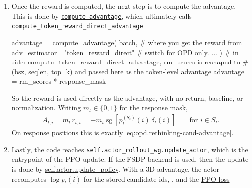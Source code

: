 \begin{enumerate}

    \item Once the reward is computed, the next step is to compute the advantage. This is done by \href{https://github.com/Thinking-Space/Rethinking-OPD/blob/ac26e38d6f1572eb027597b48a9f4e01f6915ef8/verl/verl/trainer/ppo/ray_trainer.py#L1380}{\texttt{compute\_advantage}}, which ultimately calls \href{https://github.com/Thinking-Space/Rethinking-OPD/blob/ac26e38d6f1572eb027597b48a9f4e01f6915ef8/verl/verl/trainer/ppo/core_algos.py#L884}{\texttt{compute\_token\_reward\_direct\_advantage}}
\begin{codeblock}[language=Python]
advantage = compute_advantage(
    batch, # where you get the reward from
    adv_estimator= "token_reward_direct" # switch for OPD only.
    ... 
)
# in side: compute_token_reward_direct_advantage, rm_scores is reshaped to 
# (bsz, seqlen, top_k) and passed here as the token-level advantage 
advantage = rm_scores * response_mask
\end{codeblock}
    So the reward is used directly as the advantage, with no return, baseline, or
    normalization. Writing $m_t\in\{0,1\}$ for the response mask,
    \begin{align}
        A_{t,i}
        =
        m_t\, r_{t,i}
        =
        -m_t\operatorname{sg}\!\left[
            \bar{p}_t^{(S_t)}(i)\,\delta_t(i)
        \right]
        \qquad \text{for } i\in S_t.
        \label{eq:opd.rethinking-advantage}
    \end{align}
    On response positions this is exactly \eqref{eq:opd.rethinking-cand-advantage}.
    \item Lastly, the code reaches \href{https://github.com/Thinking-Space/Rethinking-OPD/blob/ac26e38d6f1572eb027597b48a9f4e01f6915ef8/verl/verl/trainer/ppo/ray_trainer.py#L2259}{\texttt{self.actor\_rollout\_wg.update\_actor}}, which is the entrypoint of the PPO update. If the FSDP backend is used, then the update is done by \href{https://github.com/Thinking-Space/Rethinking-OPD/blob/ac26e38d6f1572eb027597b48a9f4e01f6915ef8/verl/verl/workers/fsdp_workers.py#L880}{self.actor.update\_policy}.
    With a 3D advantage, the actor recomputes $\log p_t(i)$ for the stored candidate
    ids, , and the
    \href{https://github.com/Thinking-Space/Rethinking-OPD/blob/ac26e38d6f1572eb027597b48a9f4e01f6915ef8/verl/verl/trainer/ppo/core_algos.py#L1118}{PPO loss}

\end{enumerate}
